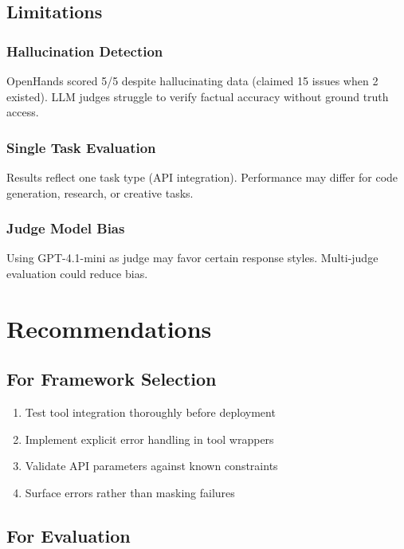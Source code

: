\documentclass[11pt,a4paper]{article}
\begin{document}
\subsection{Limitations}

\subsubsection{Hallucination Detection}

OpenHands scored 5/5 despite hallucinating data (claimed 15 issues when 2 existed). LLM judges struggle to verify factual accuracy without ground truth access.

\subsubsection{Single Task Evaluation}

Results reflect one task type (API integration). Performance may differ for code generation, research, or creative tasks.

\subsubsection{Judge Model Bias}

Using GPT-4.1-mini as judge may favor certain response styles. Multi-judge evaluation could reduce bias.

\section{Recommendations}

\subsection{For Framework Selection}

\begin{enumerate}
    \item Test tool integration thoroughly before deployment
    \item Implement explicit error handling in tool wrappers
    \item Validate API parameters against known constraints
    \item Surface errors rather than masking failures
\end{enumerate}

\subsection{For Evaluation}
\end{document}

